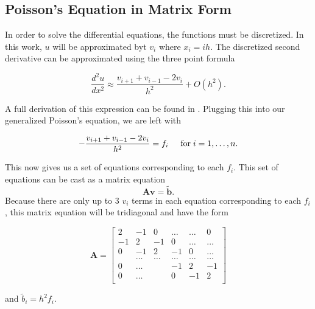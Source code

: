 \documentclass[%
oneside,                 %
final,                   %
10pt]{article}
\begin{document}
\subsection{Poisson's Equation in Matrix Form}

In order to solve the differential equations, the functions must be discretized.  In this work, $u$ will be approximated byt $v_i$ where $x_i=ih$.  The discretized second derivative can be approximated using the three point formula

\begin{equation*}
\frac{d^2u}{dx^2} \approx \frac{v_{i+1} + v_{i-1} - 2v_i}{h^2} + O(h^2).
\end{equation*}
 
A full derivation of this expression can be found in \cite{LectureNotes}. Plugging this into our generalized Poisson's equation, we are left with

\begin{equation*}
   -\frac{v_{i+1}+v_{i-1}-2v_i}{h^2} = f_i  \hspace{0.5cm} \mathrm{for} \hspace{0.1cm} i=1,\dots, n.
\end{equation*}

This now gives us a set of equations corresponding to each $f_i$.  This set of equations can be cast as a matrix equation
\begin{equation*}
   \mathbf{A}\mathbf{v} = \tilde{\mathbf{b}}.
\end{equation*}
 Because there are only up to 3 $v_i$ terms in each equation corresponding to each $f_i$, this matrix equation will be tridiagonal and have the form

\[
    \mathbf{A} = \begin{bmatrix}
                           2& -1& 0 &\dots   & \dots &0 \\
                           -1 & 2 & -1 &0 &\dots &\dots \\
                           0&-1 &2 & -1 & 0 & \dots \\
                           & \dots   & \dots &\dots   &\dots & \dots \\
                           0&\dots   &  &-1 &2& -1 \\
                           0&\dots    &  & 0  &-1 & 2 \\
                      \end{bmatrix}
\]

and $\tilde{b}_i=h^2f_i$.
\end{document}

